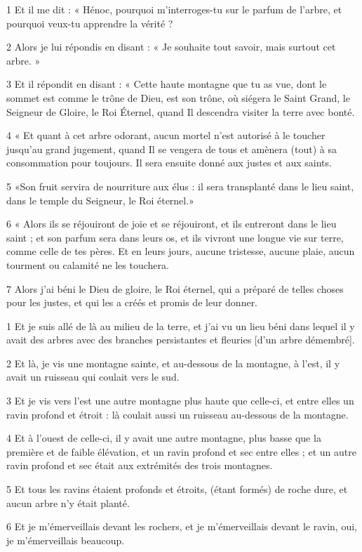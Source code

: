 \par 1 Et il me dit : « Hénoc, pourquoi m'interroges-tu sur le parfum de l'arbre, et pourquoi veux-tu apprendre la vérité ?
\par 2 Alors je lui répondis en disant : « Je souhaite tout savoir, mais surtout cet arbre. »
\par 3 Et il répondit en disant : « Cette haute montagne que tu as vue, dont le sommet est comme le trône de Dieu, est son trône, où siégera le Saint Grand, le Seigneur de Gloire, le Roi Éternel, quand Il descendra visiter la terre avec bonté.
\par 4 « Et quant à cet arbre odorant, aucun mortel n'est autorisé à le toucher jusqu'au grand jugement, quand Il se vengera de tous et amènera (tout) à sa consommation pour toujours. Il sera ensuite donné aux justes et aux saints.
\par 5 «Son fruit servira de nourriture aux élus : il sera transplanté dans le lieu saint, dans le temple du Seigneur, le Roi éternel.»
\par 6 « Alors ils se réjouiront de joie et se réjouiront, et ils entreront dans le lieu saint ; et son parfum sera dans leurs os, et ils vivront une longue vie sur terre, comme celle de tes pères. Et en leurs jours, aucune tristesse, aucune plaie, aucun tourment ou calamité ne les touchera.
\par 7 Alors j'ai béni le Dieu de gloire, le Roi éternel, qui a préparé de telles choses pour les justes, et qui les a créés et promis de leur donner.


\par 1 Et je suis allé de là au milieu de la terre, et j'ai vu un lieu béni dans lequel il y avait des arbres avec des branches persistantes et fleuries [d'un arbre démembré].
\par 2 Et là, je vis une montagne sainte, et au-dessous de la montagne, à l'est, il y avait un ruisseau qui coulait vers le sud.
\par 3 Et je vis vers l'est une autre montagne plus haute que celle-ci, et entre elles un ravin profond et étroit : là coulait aussi un ruisseau au-dessous de la montagne.
\par 4 Et à l'ouest de celle-ci, il y avait une autre montagne, plus basse que la première et de faible élévation, et un ravin profond et sec entre elles ; et un autre ravin profond et sec était aux extrémités des trois montagnes.
\par 5 Et tous les ravins étaient profonds et étroits, (étant formés) de roche dure, et aucun arbre n'y était planté.
\par 6 Et je m'émerveillais devant les rochers, et je m'émerveillais devant le ravin, oui, je m'émerveillais beaucoup.

